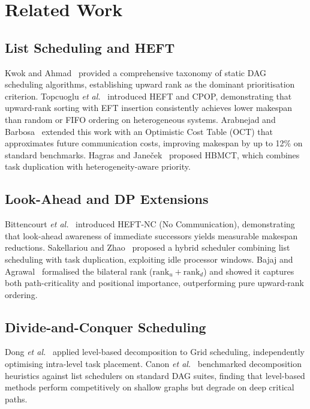 \documentclass[conference]{IEEEtran}
\newcommand{\ranku}{\mathrm{rank}_u}
\newcommand{\rankd}{\mathrm{rank}_d}
\begin{document}
\section{Related Work}
\label{sec:related}

\subsection{List Scheduling and HEFT}

Kwok and Ahmad~\cite{kwok1999static} provided a comprehensive
taxonomy of static DAG scheduling algorithms, establishing upward
rank as the dominant prioritisation criterion. Topcuoglu
\textit{et al.}~\cite{topcuoglu2002heft} introduced HEFT and CPOP,
demonstrating that upward-rank sorting with EFT insertion consistently
achieves lower makespan than random or FIFO ordering on heterogeneous
systems. Arabnejad and Barbosa~\cite{arabnejad2014cpop} extended this
work with an Optimistic Cost Table (OCT) that approximates future
communication costs, improving makespan by up to 12\% on standard
benchmarks. Hagras and Jane\v{c}ek~\cite{hagras2003static} proposed
HBMCT, which combines task duplication with heterogeneity-aware
priority.

\subsection{Look-Ahead and DP Extensions}

Bittencourt \textit{et al.}~\cite{bittencourt2018heft} introduced
HEFT-NC (No Communication), demonstrating that look-ahead awareness
of immediate successors yields measurable makespan reductions.
Sakellariou and Zhao~\cite{sakellariou2004hybrid} proposed a hybrid
scheduler combining list scheduling with task duplication, exploiting
idle processor windows. Bajaj and Agrawal~\cite{bajaj2004improving}
formalised the bilateral rank ($\ranku + \rankd$) and showed it
captures both path-criticality and positional importance, outperforming
pure upward-rank ordering.

\subsection{Divide-and-Conquer Scheduling}

Dong \textit{et al.}~\cite{dong2007divide} applied level-based
decomposition to Grid scheduling, independently optimising intra-level
task placement. Canon \textit{et al.}~\cite{canon2008comparative}
benchmarked decomposition heuristics against list schedulers on
standard DAG suites, finding that level-based methods perform
competitively on shallow graphs but degrade on deep critical paths.
\end{document}

